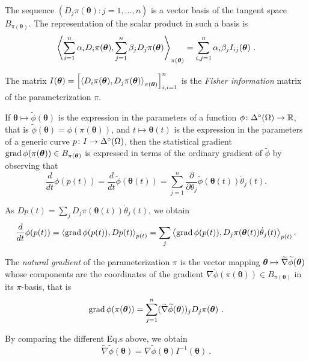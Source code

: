 \documentclass[12pt,a4paper]{amsart}
\begin{document}
The sequence $(D_j \pi(\bm \theta) \colon j = 1,\dots,n)$ is a vector basis of the tangent space $B_{\pi(\bm\theta)}$. The representation of the scalar product in such a basis is
%
\begin{equation*}
  \scalarat{\pi(\bm\theta)}{\sum_{i=1}^n \alpha_i D_i \pi(\bm \theta)}{\sum_{j=1}^n \beta_j D_j \pi(\bm \theta)} = \sum_{i,j=1}^n \alpha_i\beta_j I_{ij}(\bm\theta) \ .
\end{equation*}
%
\begin{definition}
The matrix $I(\bm\theta) = \left[\scalarat{\pi(\bm\theta)}{D_i \pi(\bm \theta)}{D_j \pi(\bm \theta)}\right]_{i,i=1}^n$ is the \emph{Fisher information} matrix of the parameterization $\pi$.
\end{definition}

If $\bm\theta \mapsto \widetilde \phi(\bm\theta)$ is the expression in the parameters of a function $\phi \colon \oSimO \to \mathbb R$, that is $\widetilde \phi(\bm\theta) = \phi(\pi(\bm\theta))$,  and $t \mapsto \bm\theta(t)$ is the expression in the parameters of a generic curve $p \colon I \to \oSimO$, then the statistical gradient $\grad \phi(\pi(\btheta)) \in B_{\pi(\btheta)}$ is expressed in terms of the ordinary gradient of $\widetilde \phi$ by observing that
%
\begin{equation*}
  \frac{d}{dt} \phi(p(t)) = \frac{d}{dt} \widetilde\phi(\bm\theta(t)) = \sum_{j=1}^n \frac{\partial}{\partial\theta_j} \widetilde\phi(\bm\theta(t)) \dot\theta_j(t).
\end{equation*}

As $D p(t)=\sum_j D_j \pi(\bm\theta(t)) \dot \theta_j(t)$, we obtain
%
\begin{equation*}
  \frac{d}{dt} \phi(p(t)) = \scalarat {p(t)} {\grad \phi(p(t))} {D p(t)} = \sum_j \scalarat {p(t)} {\grad \phi(p(t))} {D_j \pi(\bm\theta(t)) \dot \theta_j(t)}.
\end{equation*}

\begin{definition}
The \emph{natural gradient} of the parameterization $\pi$ is the vector mapping $\btheta \mapsto \widetilde \nabla \widetilde\phi(\bm\theta)$ whose components are the coordinates of the gradient $\nabla \widetilde\phi(\pi(\bm \theta)) \in B_{\pi(\bm\theta)}$ in its $\pi$-basis, that is
%
\begin{equation*}
 \grad \phi(\pi(\bm \theta)) = \sum_{j=1}^n (\widetilde \nabla \widetilde\phi(\bm\theta))_j D_j \pi(\bm\theta) \ .
\end{equation*}

By comparing the different Eq.s above, we obtain
%
\begin{equation*}
  \widetilde \nabla \widetilde\phi(\bm\theta) = \nabla \widetilde\phi(\bm\theta) I^{-1}(\bm\theta) \ .
\end{equation*}
\end{definition}
\end{document}
